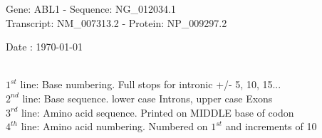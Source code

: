 \documentclass{article}
\begin{document}
\renewcommand{\footrulewidth}{1pt}
\renewcommand{\headrulewidth}{0pt}
\begin{center}
\begin{large}
Gene: ABL1 - Sequence: NG\_012034.1\\
Transcript: NM\_007313.2 - Protein: NP\_009297.2
 
 Date : \today\\\\
\end{large}
\end{center}
$1^{st}$ line: Base numbering. Full stops for intronic +/- 5, 10, 15...\\
$2^{nd}$ line: Base sequence. lower case Introns, upper case Exons\\
$3^{rd}$ line: Amino acid sequence. Printed on MIDDLE base of codon\\
$4^{th}$ line: Amino acid numbering. Numbered on $1^{st}$ and increments of 10\\
\end{document}
